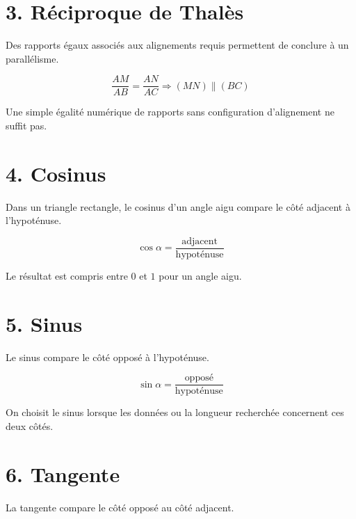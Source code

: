 
\section{3. Réciproque de Thalès}
Des rapports égaux associés aux alignements requis permettent de conclure à un parallélisme.

\[
\dfrac{AM}{AB}=\dfrac{AN}{AC}\Rightarrow(MN)\parallel(BC)
\]

\begin{exemple}
Une simple égalité numérique de rapports sans configuration d’alignement ne suffit pas.
\end{exemple}

\section{4. Cosinus}
Dans un triangle rectangle, le cosinus d’un angle aigu compare le côté adjacent à l’hypoténuse.

\[
\cos\alpha=\dfrac{\text{adjacent}}{\text{hypoténuse}}
\]

\begin{exemple}
Le résultat est compris entre $0$ et $1$ pour un angle aigu.
\end{exemple}

\section{5. Sinus}
Le sinus compare le côté opposé à l’hypoténuse.

\[
\sin\alpha=\dfrac{\text{opposé}}{\text{hypoténuse}}
\]

\begin{exemple}
On choisit le sinus lorsque les données ou la longueur recherchée concernent ces deux côtés.
\end{exemple}


\section{6. Tangente}
La tangente compare le côté opposé au côté adjacent.

